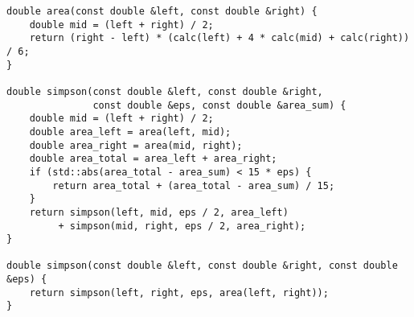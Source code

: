 \begin{lstlisting}
double area(const double &left, const double &right) {
    double mid = (left + right) / 2;
    return (right - left) * (calc(left) + 4 * calc(mid) + calc(right)) / 6;
}

double simpson(const double &left, const double &right,
               const double &eps, const double &area_sum) {
    double mid = (left + right) / 2;
    double area_left = area(left, mid);
    double area_right = area(mid, right);
    double area_total = area_left + area_right;
    if (std::abs(area_total - area_sum) < 15 * eps) {
        return area_total + (area_total - area_sum) / 15;
    }
    return simpson(left, mid, eps / 2, area_left)
         + simpson(mid, right, eps / 2, area_right);
}

double simpson(const double &left, const double &right, const double &eps) {
    return simpson(left, right, eps, area(left, right));
}
\end{lstlisting}
